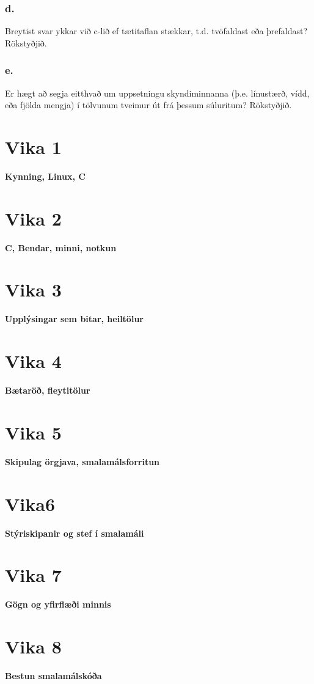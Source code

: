 \documentclass{article}
\begin{document}
\subsubsection{d.}Breytist svar ykkar við c-lið ef tætitaflan stækkar, t.d. tvöfaldast eða þrefaldast?
Rökstyðjið.

\subsubsection{e.}Er hægt að segja eitthvað um uppsetningu skyndiminnanna (þ.e. línustærð, vídd,
eða fjölda mengja) í tölvunum tveimur út frá þessum súluritum? Rökstyðjið.

\section{Vika 1}
\large{\textbf{Kynning, Linux, C}}


\section{Vika 2}
\large{\textbf{C, Bendar, minni, notkun}}


\section{Vika 3}
\large{\textbf{Upplýsingar sem bitar, heiltölur}}


\section{Vika 4}
\large{\textbf{Bætaröð, fleytitölur}}


\section{Vika 5}
\large{\textbf{Skipulag örgjava, smalamálsforritun}}


\section{Vika6}
\large{\textbf{Stýriskipanir og stef í smalamáli}}


\section{Vika 7}
\large{\textbf{Gögn og yfirflæði minnis}}


\section{Vika 8}
\large{\textbf{Bestun smalamálskóða}}
\end{document}
